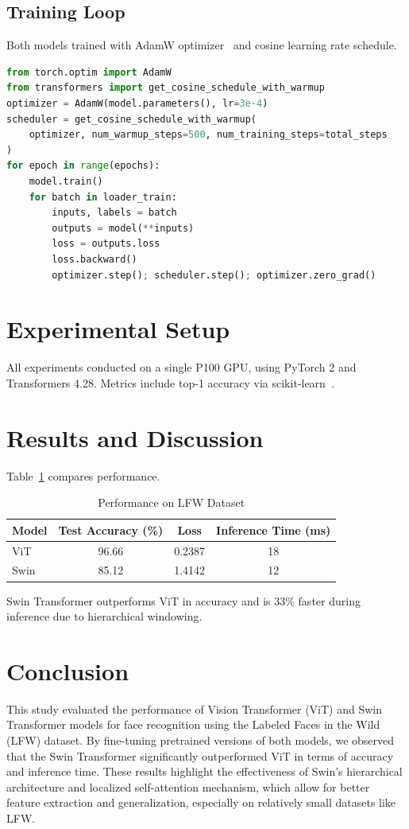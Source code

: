 \documentclass[twocolumn]{IEEEtran}
\begin{document}
\subsection{Training Loop}
\setlength{\parindent}{4em}
Both models trained with AdamW optimizer~\cite{loshchilov2019decoupled} and cosine learning rate schedule.
\begin{lstlisting}[language=Python, caption=Training Loop Snippet]
from torch.optim import AdamW
from transformers import get_cosine_schedule_with_warmup
optimizer = AdamW(model.parameters(), lr=3e-4)
scheduler = get_cosine_schedule_with_warmup(
    optimizer, num_warmup_steps=500, num_training_steps=total_steps
)
for epoch in range(epochs):
    model.train()
    for batch in loader_train:
        inputs, labels = batch
        outputs = model(**inputs)
        loss = outputs.loss
        loss.backward()
        optimizer.step(); scheduler.step(); optimizer.zero_grad()
\end{lstlisting}

\section{Experimental Setup}
All experiments conducted on a single P100 GPU, using PyTorch 2 and Transformers 4.28. Metrics include top-1 accuracy via scikit-learn~\cite{pedregosa2011scikit}.

\section{Results and Discussion}
\setlength{\parindent}{0pt}
Table~\ref{tab:results} compares performance.
\begin{table}[H]
\centering
\caption{Performance on LFW Dataset}
\label{tab:results}
\begin{tabular}{lccc}
\hline
Model & Test Accuracy (\%) & Loss   & Inference Time (ms) \\
\hline
ViT   & 96.66              & 0.2387 & 18                  \\
Swin  & 85.12              & 1.4142 & 12                  \\
\hline
\end{tabular}
\end{table}
Swin Transformer outperforms ViT in accuracy and is 33\% faster during inference due to hierarchical windowing.

\section{Conclusion}
\setlength{\parindent}{4em}
This study evaluated the performance of Vision Transformer (ViT) and Swin Transformer models for face recognition using the Labeled Faces in the Wild (LFW) dataset. By fine-tuning pretrained versions of both models, we observed that the Swin Transformer significantly outperformed ViT in terms of accuracy and inference time. These results highlight the effectiveness of Swin’s hierarchical architecture and localized self-attention mechanism, which allow for better feature extraction and generalization, especially on relatively small datasets like LFW.
\end{document}
